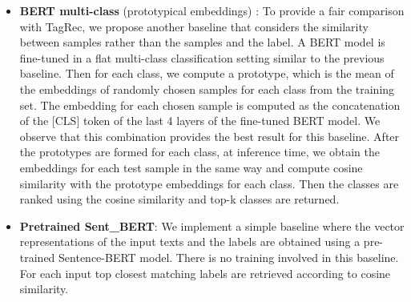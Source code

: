 \documentclass[runningheads, envcountsame, a4paper]{llncs}
\begin{document}
\begin{itemize}
    \item \textbf{BERT multi-class} (prototypical embeddings) \cite{snell2017prototypical}: To provide a fair comparison with TagRec, we propose another baseline that considers the similarity between samples rather than the samples and the label. A BERT model is fine-tuned in a flat multi-class classification setting similar to the previous baseline. Then for each class, we compute a prototype, which is the mean of the embeddings of randomly chosen samples for each class from the training set. The embedding for each chosen sample is computed as the concatenation of the [CLS] token of the last 4 layers of the fine-tuned BERT model. We observe that this combination provides the best result for this baseline. After the prototypes are formed for each class, at inference time, we obtain the embeddings for each test sample in the same way and compute cosine similarity with the prototype embeddings for each class. Then the classes are ranked using the cosine similarity and top-k classes are returned.
    
    \item \textbf{Pretrained Sent\_BERT}: We implement a simple baseline where the vector representations of the input texts and the labels are obtained using a pre-trained Sentence-BERT model. There is no training involved in this baseline. For each input top closest matching labels are retrieved according to cosine similarity.
        \end{itemize}
\end{document}
